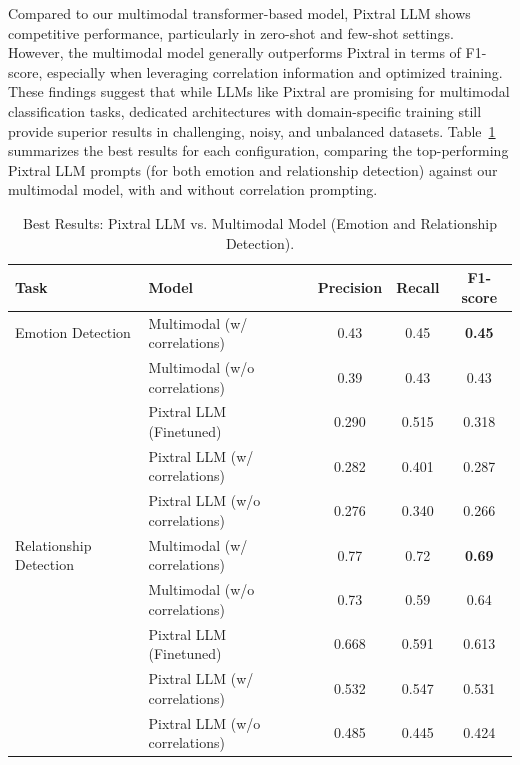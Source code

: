 \documentclass[letterpaper,journal]{IEEEtran}
\begin{document}
Compared to our multimodal transformer-based model, Pixtral LLM shows competitive performance, particularly in zero-shot and few-shot settings. However, the multimodal model generally outperforms Pixtral in terms of F1-score, especially when leveraging correlation information and optimized training. These findings suggest that while LLMs like Pixtral are promising for multimodal classification tasks, dedicated architectures with domain-specific training still provide superior results in challenging, noisy, and unbalanced datasets.
Table~\ref{tab:pixtral_vs_multimodal} summarizes the best results for each configuration, comparing the top-performing Pixtral LLM prompts (for both emotion and relationship detection) against our multimodal model, with and without correlation prompting.

\begin{table}[htb!]
\setlength{\tabcolsep}{3pt}
\begin{center}
{\footnotesize
\begin{tabular}{l|l|c|c|c}
\hline
\textbf{Task} & \textbf{Model} & \textbf{Precision} & \textbf{Recall} & \textbf{F1-score} \\
\hline
Emotion Detection & Multimodal (w/ correlations) & 0.43 & 0.45 & \textbf{0.45} \\
 & Multimodal (w/o correlations) & 0.39 & 0.43 & 0.43 \\
 & Pixtral LLM (Finetuned) & 0.290 & 0.515 & 0.318 \\
 & Pixtral LLM (w/ correlations) & 0.282 & 0.401 & 0.287 \\
 & Pixtral LLM (w/o correlations) & 0.276 & 0.340 & 0.266 \\
\hline
Relationship Detection & Multimodal (w/ correlations) & 0.77 & 0.72 & \textbf{0.69} \\
 & Multimodal (w/o correlations) & 0.73 & 0.59 & 0.64 \\
 & Pixtral LLM (Finetuned) & 0.668 & 0.591 & 0.613 \\
 & Pixtral LLM (w/ correlations) & 0.532 & 0.547 & 0.531 \\
 & Pixtral LLM (w/o correlations) & 0.485 & 0.445 & 0.424 \\
\hline
\end{tabular}
}
\end{center}
\setlength{\belowcaptionskip}{-0.1cm}
\caption{Best Results: Pixtral LLM vs. Multimodal Model (Emotion and Relationship Detection).}
\label{tab:pixtral_vs_multimodal}
\end{table}
\end{document}
